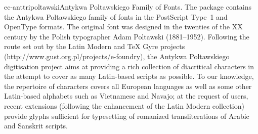 \documentclass{ddltxtyp}
\begin{document}
\begin{package}{ec-anttri}{poltawski}{Antykwa Poltawskiego Family of Fonts.}
The package contains the Antykwa Poltawskiego family of fonts
in the PostScript Type~1 and OpenType formats. The original
font was designed in the twenties of the XX century by the
Polish typographer Adam Poltawski (1881--1952). Following the
route set out by the Latin Modern and {\TeX} Gyre projects
(http://www.gust.org.pl/projects/e-foundry), the Antykwa
Poltawskiego digitisation project aims at providing a rich
collection of diacritical characters in the attempt to cover as
many Latin-based scripts as possible. To our knowledge, the
repertoire of characters covers all European languages as well
as some other Latin-based alphabets such as Vietnamese and
Navajo; at the request of users, recent extensions (following
the enhancement of the Latin Modern collection) provide glyphs
sufficient for typesetting of romanized transliterations of
Arabic and Sanskrit scripts. %
\end{package}
\end{document}
